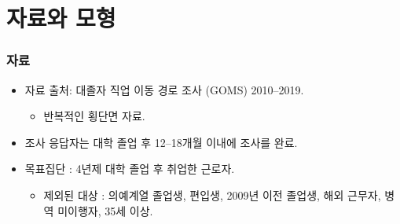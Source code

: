 \documentclass[aspectratio=169,xcolor=dvipsnames,handout]{beamer}
\begin{document}
\section{자료와 모형}%

\begin{frame}
    \frametitle{자료}
    \begin{itemize}[<+->]
        \item 자료 출처: 대졸자 직업 이동 경로 조사 (GOMS) 2010--2019.
        \begin{itemize}
            \item 반복적인 횡단면 자료.
        \end{itemize}
        \item 조사 응답자는 대학 졸업 후 12--18개월 이내에 조사를 완료.
        \item 목표집단 : 4년제 대학 졸업 후 취업한 근로자.
        \begin{itemize}
            \item 제외된 대상 : 의예계열 졸업생, 편입생, 2009년 이전 졸업생, 해외 근무자, 병역 미이행자, 35세 이상.
        \end{itemize}
    \end{itemize}
\end{frame}
\end{document}
